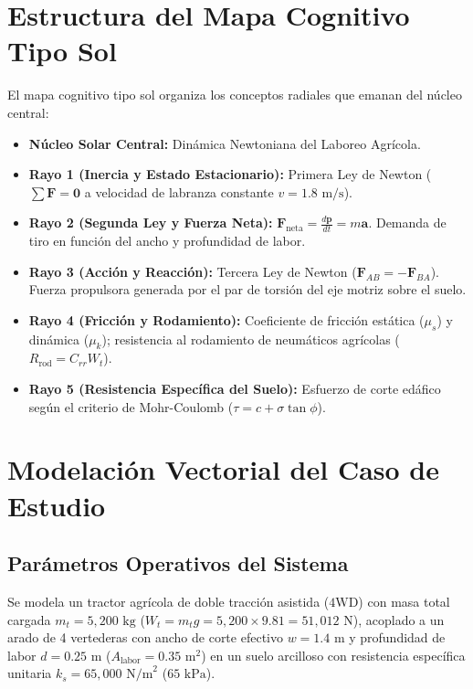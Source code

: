\documentclass[12pt,spanish,letterpaper,oneside]{article}
\begin{document}
\section{Estructura del Mapa Cognitivo Tipo Sol}
El mapa cognitivo tipo sol organiza los conceptos radiales que emanan del núcleo central:
\begin{itemize}
    \item \textbf{Núcleo Solar Central:} Dinámica Newtoniana del Laboreo Agrícola.
    \item \textbf{Rayo 1 (Inercia y Estado Estacionario):} Primera Ley de Newton ($\sum \mathbf{F} = \mathbf{0}$ a velocidad de labranza constante $v = 1.8\text{ m/s}$).
    \item \textbf{Rayo 2 (Segunda Ley y Fuerza Neta):} $\mathbf{F}_{\text{neta}} = \frac{d\mathbf{p}}{dt} = m \mathbf{a}$. Demanda de tiro en función del ancho y profundidad de labor.
    \item \textbf{Rayo 3 (Acción y Reacción):} Tercera Ley de Newton ($\mathbf{F}_{AB} = -\mathbf{F}_{BA}$). Fuerza propulsora generada por el par de torsión del eje motriz sobre el suelo.
    \item \textbf{Rayo 4 (Fricción y Rodamiento):} Coeficiente de fricción estática ($\mu_s$) y dinámica ($\mu_k$); resistencia al rodamiento de neumáticos agrícolas ($R_{\text{rod}} = C_{rr} W_t$).
    \item \textbf{Rayo 5 (Resistencia Específica del Suelo):} Esfuerzo de corte edáfico según el criterio de Mohr-Coulomb ($\tau = c + \sigma \tan \phi$).
\end{itemize}

\section{Modelación Vectorial del Caso de Estudio}
\subsection{Parámetros Operativos del Sistema}
Se modela un tractor agrícola de doble tracción asistida ($4\text{WD}$) con masa total cargada $m_t = 5,200\text{ kg}$ ($W_t = m_t g = 5,200 \times 9.81 = 51,012\text{ N}$), acoplado a un arado de 4 vertederas con ancho de corte efectivo $w = 1.4\text{ m}$ y profundidad de labor $d = 0.25\text{ m}$ ($A_{\text{labor}} = 0.35\text{ m}^2$) en un suelo arcilloso con resistencia específica unitaria $k_s = 65,000\text{ N/m}^2$ ($65\text{ kPa}$).
\end{document}
